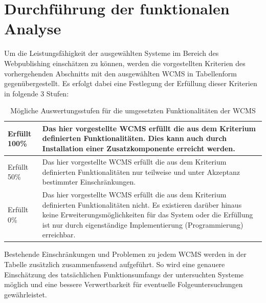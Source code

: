 \section{Durchführung der funktionalen Analyse}
\label{sec:durchanalyse}
Um die Leistungsfähigkeit der ausgewählten Systeme im Bereich des Webpublishing einschätzen zu können, werden die vorgestellten Kriterien des vorhergehenden Abschnitts mit den ausgewählten WCMS in Tabellenform gegenübergestellt. Es erfolgt dabei eine Festlegung der Erfüllung dieser Kriterien in folgende 3 Stufen:

\begin{table}[!h]
\renewcommand{\arraystretch}{1.5}
\center
\caption{Mögliche Auswertungsstufen für die umgesetzten Funktionalitäten der WCMS}
\begin{tabular}{|l|p{10cm}|}
\hline
\cellcolor{green} Erfüllt 100\% & Das hier vorgestellte WCMS erfüllt die aus dem
Kriterium definierten Funktionalitäten. Dies kann auch durch Installation einer Zusatzkomponente erreicht werden.\\
\hline
\cellcolor{yellow} Erfüllt 50\% & Das hier vorgestellte WCMS erfüllt die aus dem
Kriterium definierten Funktionalitäten nur teilweise und unter Akzeptanz bestimmter Einschränkungen.\\
\hline
\cellcolor{red} Erfüllt 0\% & Das hier vorgestellte WCMS erfüllt die aus dem
Kriterium definierten Funktionalitäten nicht. Es existieren darüber hinaus keine Erweiterungsmöglichkeiten für das System oder die Erfüllung ist nur durch eigenständige Implementierung (Programmierung) erreichbar.\\
\hline
\end{tabular}
\end{table}
Bestehende Einschränkungen und Problemen zu jedem WCMS werden in der Tabelle zusätzlich zusammenfassend aufgeführt. So wird eine genauere Einschätzung des tatsächlichen Funktionsumfangs der untersuchten Systeme möglich und eine bessere Verwertbarkeit für eventuelle Folgeuntersuchungen gewährleistet.
